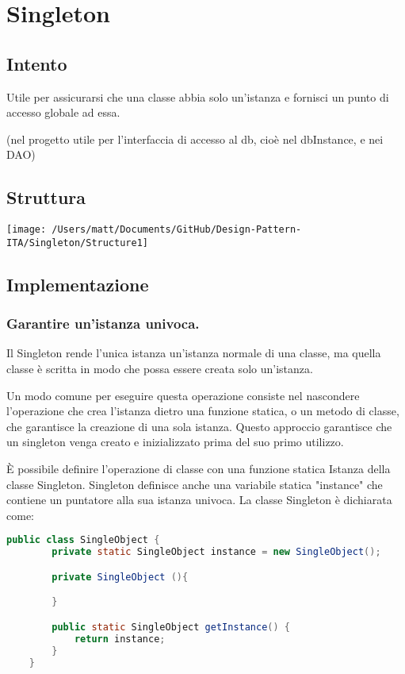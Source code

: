 \chapter{Singleton}
\section{Intento}

Utile per assicurarsi che una classe abbia solo un'istanza e fornisci un punto di accesso globale ad essa.

(nel progetto utile per l'interfaccia di accesso al db, cioè nel dbInstance, e nei DAO)


\section{Struttura}

\texttt{[image: /Users/matt/Documents/GitHub/Design-Pattern-ITA/Singleton/Structure1]}


\section{Implementazione}

\subsection{Garantire un'istanza univoca.}
Il Singleton rende l'unica istanza un'istanza normale di una classe, ma quella classe è scritta in modo che possa essere creata solo un'istanza.

Un modo comune per eseguire questa operazione consiste nel nascondere l'operazione che crea l'istanza dietro una funzione statica, o un metodo di classe, che garantisce la creazione di una sola istanza. Questo approccio garantisce che un singleton venga creato e inizializzato prima del suo primo utilizzo.

È possibile definire l'operazione di classe con una funzione statica Istanza della classe Singleton. Singleton definisce anche una variabile statica "instance" che contiene un puntatore alla sua istanza univoca.
La classe Singleton è dichiarata come:

\begin{lstlisting}[language=java]
    public class SingleObject {
        private static SingleObject instance = new SingleObject();

        private SingleObject (){

        }

        public static SingleObject getInstance() {
            return instance;
        }
    }
\end{lstlisting}

